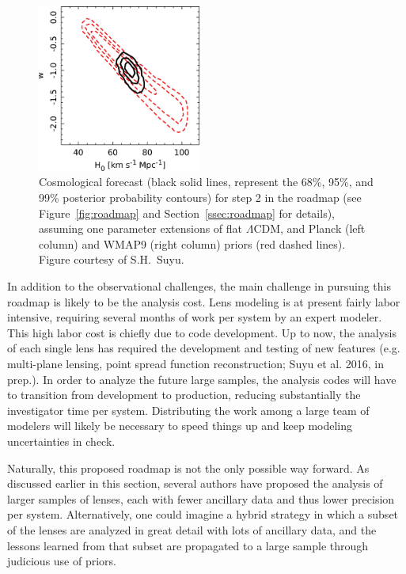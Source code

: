 \begin{figure}
\begin{center}
\includegraphics[height=5.5cm,clip]{figures/wmap9_wcdm_c22lenses_stats.jpg}
\end{center}
\caption{Cosmological forecast (black solid lines, represent the 68\%,
95\%, and 99\% posterior probability contours) for step 2 in the roadmap
(see Figure~\ref{fig:roadmap} and Section~\ref{ssec:roadmap} for
details), assuming one parameter extensions of flat $\Lambda$CDM, and
Planck (left column) and WMAP9 (right column) priors (red dashed lines).
Figure courtesy of S.H.~Suyu.}
\label{fig:roadmap-step2}
\end{figure}

In addition to the observational challenges, the main challenge in
pursuing this roadmap is likely to be the analysis cost. Lens modeling
is at present fairly labor intensive, requiring several months of work
per system by an expert modeler. This high labor cost is chiefly due
to code development. Up to now, the analysis of each single lens has
required the development and testing of new features (e.g. multi-plane
lensing, point spread function reconstruction; Suyu et al. 2016, in
prep.). In order to analyze the future large samples, the analysis
codes will have to transition from development to production, reducing
substantially the investigator time per system. Distributing the work
among a large team of modelers will likely be necessary to speed
things up and keep modeling uncertainties in check.

Naturally, this proposed roadmap is not the only possible way
forward. As discussed earlier in this section, several authors have
proposed the analysis of larger samples of lenses, each with fewer
ancillary data and thus lower precision per system. Alternatively, one
could imagine a hybrid strategy in which a subset of the lenses are
analyzed in great detail with lots of ancillary data, and the lessons
learned from that subset are propagated to a large sample through
judicious use of priors.
